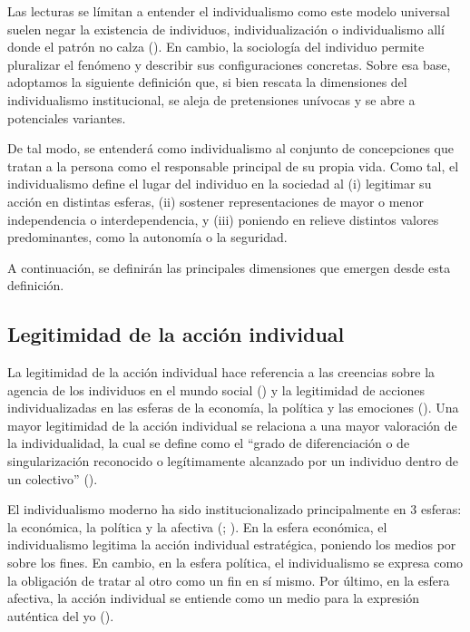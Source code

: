 \documentclass[
  letterpaper,
  DIV=11,
  numbers=noendperiod]{scrartcl}
\begin{document}
Las lecturas se límitan a entender el individualismo como este modelo
universal suelen negar la existencia de individuos, individualización o
individualismo allí donde el patrón no calza
(). En cambio, la
sociología del individuo permite pluralizar el fenómeno y describir sus
configuraciones concretas. Sobre esa base, adoptamos la siguiente
definición que, si bien rescata la dimensiones del individualismo
institucional, se aleja de pretensiones unívocas y se abre a potenciales
variantes.

De tal modo, se entenderá como individualismo al conjunto de
concepciones que tratan a la persona como el responsable principal de su
propia vida. Como tal, el individualismo define el lugar del individuo
en la sociedad al (i) legitimar su acción en distintas esferas, (ii)
sostener representaciones de mayor o menor independencia o
interdependencia, y (iii) poniendo en relieve distintos valores
predominantes, como la autonomía o la seguridad.

A continuación, se definirán las principales dimensiones que emergen
desde esta definición.

\subsection{Legitimidad de la acción
individual}\label{legitimidad-de-la-acciuxf3n-individual}

La legitimidad de la acción individual hace referencia a las creencias
sobre la agencia de los individuos en el mundo social
() y la legitimidad de
acciones individualizadas en las esferas de la economía, la política y
las emociones (). Una
mayor legitimidad de la acción individual se relaciona a una mayor
valoración de la individualidad, la cual se define como el ``grado de
diferenciación o de singularización reconocido o legítimamente alcanzado
por un individuo dentro de un colectivo''
().

El individualismo moderno ha sido institucionalizado principalmente en 3
esferas: la económica, la política y la afectiva
(;
). En la esfera
económica, el individualismo legitima la acción individual estratégica,
poniendo los medios por sobre los fines. En cambio, en la esfera
política, el individualismo se expresa como la obligación de tratar al
otro como un fin en sí mismo. Por último, en la esfera afectiva, la
acción individual se entiende como un medio para la expresión auténtica
del yo ().
\end{document}
